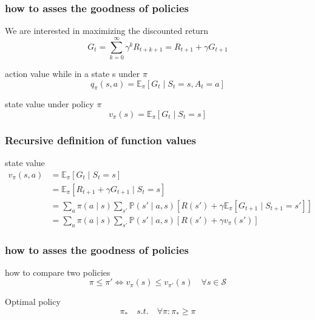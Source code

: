 \documentclass[dvipsnames,svgnames]{beamer}
\begin{document}
\begin{frame}
\frametitle{how to asses the goodness of policies}
\begin{block}{We are interested in maximizing the discounted return}
$$ G_t= \sum_{k=0}^{\infty}\gamma^k R_{t+k+1} = R_{t+1} + \gamma G_{t+1}$$
\end{block}

\pause
\begin{block}{action value while in a state s under $\pi$}
\begin{equation}
q_{\pi}(s,a) = \mathbb{E}_{\pi}[G_t\mid S_t =s,A_t=a]
\end{equation}
\end{block}

\pause
\begin{block}{state value under policy $\pi$}
\begin{equation}
v_{\pi}(s)=\mathbb{E}_{\pi}[G_t \mid S_t=s]
\end{equation}
\end{block}



\end{frame}



\begin{frame}
\frametitle{Recursive definition of function values}
\begin{block}{state value}
\begin{equation}
\begin{split}
v_{\pi}(s,a) &= \mathbb{E}_{\pi}[G_t\mid S_t =s]
\\&=\mathbb{E}_{\pi}[R_{t+1}+\gamma G_{t+1}\mid S_t =s]
\\& =\sum_{a }\pi(a \mid s) \sum_{s'}\mathbb{P}(s'\mid a,s)\left[R(s') + \gamma \mathbb{E}_{\pi}\left[G_{t+1} \mid S_{t+1}=s' \right] \right]
\\& =\sum_{a }\pi(a \mid s) \sum_{s'}\mathbb{P}(s'\mid a,s)\left[R(s') + \gamma v_{\pi}(s') \right]
\end{split}
\end{equation}
\end{block}
\end{frame}


\begin{frame}
\frametitle{how to asses the goodness of policies}
\begin{block}{how to compare two policies}
$$ \pi \leq \pi ' \iff  v_{\pi}(s) \leq v_{\pi'}(s) \quad \forall s \in \mathcal{S}
$$
\end{block}

\pause 

\begin{block}{Optimal policy}
$$ \pi_{*} \quad s.t. \quad \forall \pi : \pi_{*}\geq \pi $$
\end{block}
\end{frame}
\end{document}
